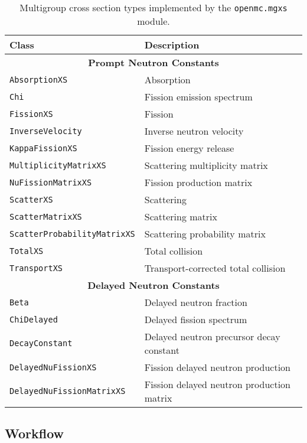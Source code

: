 \begin{table}[h!]
  \centering
  \caption{Multigroup cross section types implemented by the \texttt{openmc.mgxs} module.}
  \small
  \label{tab:mgxs-types}
  \vspace{6pt}
  \begin{tabular}{l l}
  \toprule
  \textbf{Class} &
  \textbf{Description} \\
  \midrule
  \multicolumn{2}{c}{\bf Prompt Neutron Constants} \\
  \midrule
  \texttt{AbsorptionXS} & Absorption \\
  \texttt{Chi} & Fission emission spectrum \\
  \texttt{FissionXS} & Fission \\
  \texttt{InverseVelocity} & Inverse neutron velocity \\
  \texttt{KappaFissionXS} & Fission energy release \\
  \texttt{MultiplicityMatrixXS} & Scattering multiplicity matrix \\
  \texttt{NuFissionMatrixXS} & Fission production matrix \\
  \texttt{ScatterXS} & Scattering \\
  \texttt{ScatterMatrixXS} & Scattering matrix \\
  \texttt{ScatterProbabilityMatrixXS} & Scattering probability matrix \\
  \texttt{TotalXS} & Total collision \\
  \texttt{TransportXS} & Transport-corrected total collision \\
  \midrule
  \multicolumn{2}{c}{\bf Delayed Neutron Constants} \\
  \midrule
  \texttt{Beta} & Delayed neutron fraction \\
  \texttt{ChiDelayed} & Delayed fission spectrum \\
  \texttt{DecayConstant} & Delayed neutron precursor decay constant \\
  \texttt{DelayedNuFissionXS} & Fission delayed neutron production \\
  \texttt{DelayedNuFissionMatrixXS} & Fission delayed neutron production matrix \\
  \bottomrule
\end{tabular}
\end{table}


\subsection{Workflow}
\label{subsec:workflow}

